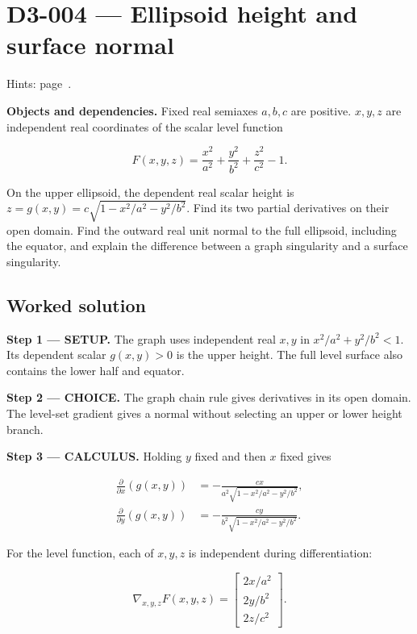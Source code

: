 \documentclass[11pt,oneside,openany]{book}
\begin{document}
\section{D3-004 --- Ellipsoid height and surface normal}
\label{problem:D3-004}
{\small Hints: page~\pageref{hints:D3-004}.}\par\medskip

\textbf{Objects and dependencies.} Fixed real semiaxes \(a,b,c\) are positive. \(x,y,z\) are independent real coordinates of the scalar level function

\[
F(x,y,z)=\frac{x^2}{a^2}+\frac{y^2}{b^2}+\frac{z^2}{c^2}-1.
\]

On the upper ellipsoid, the dependent real scalar height is
\(z=g(x,y)=c\sqrt{1-x^2/a^2-y^2/b^2}\). Find its two partial derivatives on their open domain. Find the outward real unit normal to the full ellipsoid, including the equator, and explain the difference between a graph singularity and a surface singularity.
\subsection*{Worked solution}

\textbf{Step 1 --- SETUP.} The graph uses independent real \(x,y\) in \(x^2/a^2+y^2/b^2<1\). Its dependent scalar \(g(x,y)>0\) is the upper height. The full level surface also contains the lower half and equator.

\begin{ChoiceStep}
\textbf{Step 2 --- CHOICE.} The graph chain rule gives derivatives in its open domain. The level-set gradient gives a normal without selecting an upper or lower height branch.

\end{ChoiceStep}
\textbf{Step 3 --- CALCULUS.} Holding \(y\) fixed and then \(x\) fixed gives

\[
\begin{aligned}
\frac{\partial}{\partial x}\left(g(x,y)\right)&=-\frac{cx}{a^2\sqrt{1-x^2/a^2-y^2/b^2}},\\
\frac{\partial}{\partial y}\left(g(x,y)\right)&=-\frac{cy}{b^2\sqrt{1-x^2/a^2-y^2/b^2}}.
\end{aligned}
\]

For the level function, each of \(x,y,z\) is independent during differentiation:

\[
\nabla_{x,y,z}F(x,y,z)=\begin{bmatrix}2x/a^2\\2y/b^2\\2z/c^2\end{bmatrix}.
\]
\end{document}
